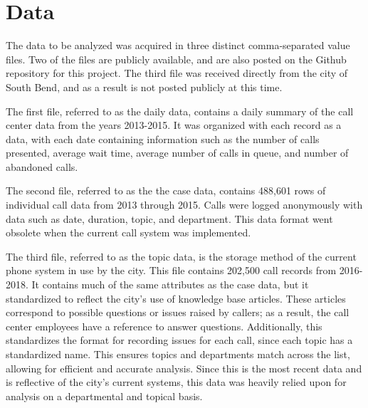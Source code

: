 \documentclass[11pt,twocolumn]{article}
\begin{document}
\section{Data}
The data to be analyzed was acquired in three distinct comma-separated value files.  Two of the files are publicly available, and are also posted on the Github repository for this project.  The third file was received directly from the city of South Bend, and as a result is not posted publicly at this time.
\par
The first file, referred to as the daily data, contains a daily summary of the call center data from the years 2013-2015.  It was organized with each record as a data, with each date containing information such as the number of calls presented, average wait time, average number of calls in queue, and number of abandoned calls.
\par
The second file, referred to as the the case data, contains 488,601 rows of individual call data from 2013 through 2015.  Calls were logged anonymously with data such as date, duration, topic, and department.  This data format went obsolete when the current call system was implemented.
\par
The third file, referred to as the topic data, is the storage method of the current phone system in use by the city.  This file contains 202,500 call records from 2016-2018.  It contains much of the same attributes as the case data, but it standardized to reflect the city's use of knowledge base articles.  These articles correspond to possible questions or issues raised by callers; as a result, the call center employees have a reference to answer questions.  Additionally, this standardizes the format for recording issues for each call, since each topic has a standardized name.  This ensures topics and departments match across the list, allowing for efficient and accurate analysis.  Since this is the most recent data and is reflective of the city's current systems, this data was heavily relied upon for analysis on a departmental and topical basis.
\end{document}
